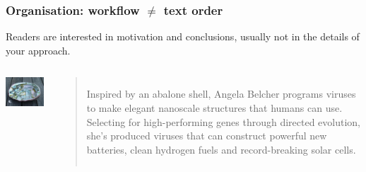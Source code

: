\documentclass{beamer}
\begin{document}
\begin{frame}
  \frametitle{Organisation: workflow $\ne$ text order}

  Readers are interested in motivation and conclusions, usually not in the details of your approach.

  \vfill

  \begin{columns}
    \includegraphics[width=\textwidth]{img/oef2-06}

    \begin{quotation}
      Inspired by an abalone shell, Angela Belcher programs viruses to make elegant nanoscale structures that humans can use. Selecting for high-performing genes through directed evolution, she’s produced viruses that can construct powerful new batteries, clean hydrogen fuels and record-breaking solar cells.
    \end{quotation}
  \end{columns}
\end{frame}
\end{document}
